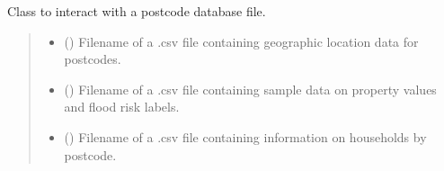 \documentclass[letterpaper,10pt,english]{sphinxmanual}
\begin{document}
\begin{fulllineitems}
\label{\detokenize{index:flood_tool.Tool}}
\pysigstartsignatures
{}
\pysigstopsignatures
\sphinxAtStartPar
Class to interact with a postcode database file.
\begin{quote}\begin{description}
\begin{itemize}
\item {} 
\sphinxAtStartPar
{} (\sphinxstyleliteralemphasis{\sphinxupquote{, }}) \textendash{} Filename of a .csv file containing geographic location
data for postcodes.

\item {} 
\sphinxAtStartPar
{} (\sphinxstyleliteralemphasis{\sphinxupquote{, }}) \textendash{} Filename of a .csv file containing sample data on property
values and flood risk labels.

\item {} 
\sphinxAtStartPar
{} (\sphinxstyleliteralemphasis{\sphinxupquote{, }}) \textendash{} Filename of a .csv file containing information on households
by postcode.

\end{itemize}

\end{description}\end{quote}


\end{fulllineitems}
\end{document}
